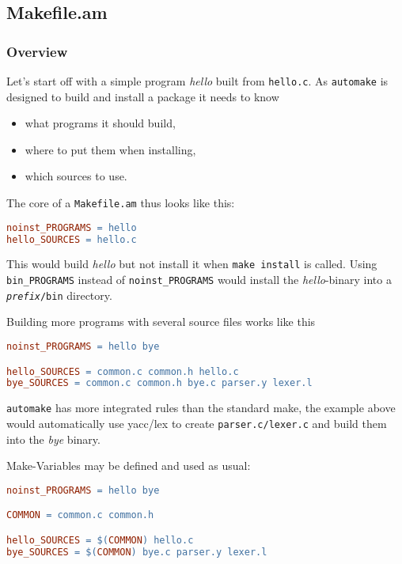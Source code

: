 \documentclass[11pt,a4paper,headinclude,footinclude,DIV16,normalheadings]{scrartcl}
\newcommand{\automake}{\texttt{automake}\xspace}
\newcommand{\makefileam}{\texttt{Makefile.am}\xspace}
\newcommand{\executable}[1]{{\em #1}\xspace}
\begin{document}
\subsection{Makefile.am}
\label{makefile.am}

\subsubsection{Overview}

Let's start off with a simple program \executable{hello} built from
\texttt{hello.c}. As \automake is designed to build and install a
package it needs to know

\begin{itemize}
\item what programs it should build,
\item where to put them when installing,
\item which sources to use.
\end{itemize}

The core of a \makefileam thus looks like this:

\begin{lstlisting}[language=make]
noinst_PROGRAMS = hello
hello_SOURCES = hello.c
\end{lstlisting}

This would build \executable{hello} but not install it when \texttt{make
  install} is called. Using \verb!bin_PROGRAMS! instead of
\verb!noinst_PROGRAMS! would install the \executable{hello}-binary into a
\texttt{\textit{prefix}/bin} directory.

Building more programs with several source files works like this

\begin{lstlisting}[language=make]
noinst_PROGRAMS = hello bye

hello_SOURCES = common.c common.h hello.c
bye_SOURCES = common.c common.h bye.c parser.y lexer.l
\end{lstlisting}

\automake has more integrated rules than the standard make, the example
above would automatically use yacc/lex to create
\texttt{parser.c/lexer.c} and build them into the {\em bye} binary.

Make-Variables may be defined and used as usual:

\begin{lstlisting}[language=make]
noinst_PROGRAMS = hello bye

COMMON = common.c common.h

hello_SOURCES = $(COMMON) hello.c
bye_SOURCES = $(COMMON) bye.c parser.y lexer.l
\end{lstlisting}
\end{document}
